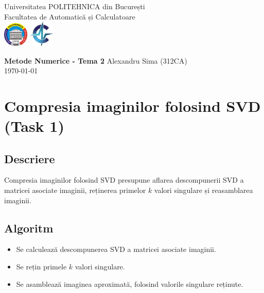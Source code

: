 \documentclass{article}
\begin{document}
\pagestyle{fancy}
\begin{titlepage}
      \begin{center}
            Universitatea POLITEHNICA din București \\
            Facultatea de Automatică și Calculatoare \\[5px]
            \includegraphics[width=1.2cm]{upb.jpg}
            \includegraphics[width=1.2cm]{acs.jpg}

            \vfill
            {\huge\bf Metode Numerice - Tema 2}
            \vfill
            Alexandru Sima (312CA) \\
            \small\today
      \end{center}
\end{titlepage}

\tableofcontents
\newpage

\section{Compresia imaginilor folosind SVD (Task 1)}

\subsection{Descriere}
Compresia imaginilor folosind SVD presupune aflarea descompunerii SVD a matricei
asociate imaginii, reținerea primelor $k$ valori singulare și reasamblarea
imaginii.

\subsection{Algoritm}
\begin{itemize}
      \item Se calculează descompunerea SVD a matricei asociate imaginii.
      \item Se rețin primele $k$ valori singulare.
      \item Se asamblează imaginea aproximată, folosind valorile singulare
            reținute.
\end{itemize}
\end{document}
